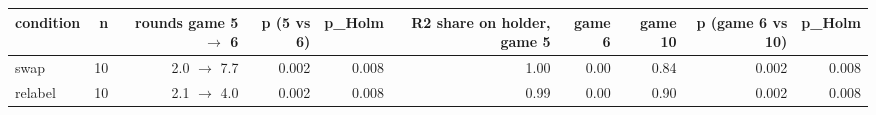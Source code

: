 \begin{tabular}{lrrrrrrrrr}
\toprule
\textbf{condition} & \textbf{n} & \textbf{rounds game 5 $\to$ 6} & \textbf{p (5 vs 6)} & \textbf{p\_Holm} & \textbf{R2 share on holder, game 5} & \textbf{game 6} & \textbf{game 10} & \textbf{p (game 6 vs 10)} & \textbf{p\_Holm} \\
\midrule
swap & 10 & 2.0 $\to$ 7.7 & 0.002 & 0.008 & 1.00 & 0.00 & 0.84 & 0.002 & 0.008 \\
relabel & 10 & 2.1 $\to$ 4.0 & 0.002 & 0.008 & 0.99 & 0.00 & 0.90 & 0.002 & 0.008 \\
\bottomrule
\end{tabular}
